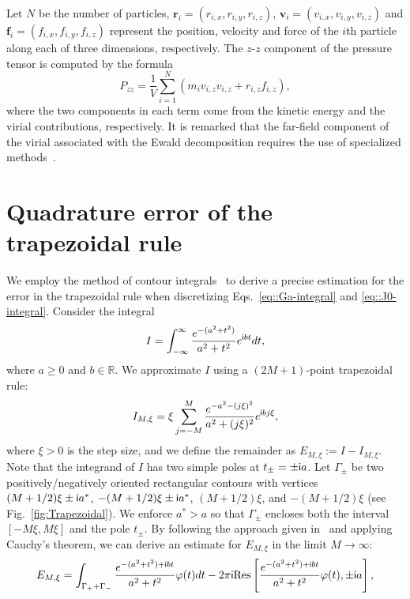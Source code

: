 Let $N$ be the number of particles, $\bm{r}_i=(r_{i,x},r_{i,y},r_{i,z})$, $\bm{v}_i=(v_{i,x},v_{i,y},v_{i,z})$ and $\bm{f}_i=(f_{i,x},f_{i,y},f_{i,z})$ represent the position, velocity and force of the $i$th particle along each of three dimensions, respectively. The $z$-$z$ component of the pressure tensor is computed by the formula
\begin{equation}
P_{zz}=\frac{1}{V} \sum_{i=1}^N\left(m_i v_{i,z} v_{i, z}+r_{i,z} f_{i,z}\right),
\end{equation}
where the two components in each term come from the kinetic energy and the virial contributions, respectively. It is remarked that the far-field component of the virial associated with the Ewald decomposition requires the use of specialized methods~\cite{liang2022random}. 

\section{Quadrature error of the trapezoidal rule}\label{app::trapezoidal}
We employ the method of contour integrals~\cite{Donaldson1972SINUA,trefethen2014Rev} to derive a precise estimation for the error in the trapezoidal rule when discretizing Eqs.~\eqref{eq::Ga-integral} and \eqref{eq::J0-integral}. Consider the integral
\begin{equation}\label{eq::A.1}
I=\int_{-\infty}^{\infty }\frac{e^{-(a^2+t^2)}}{a^2+t^2}e^{\mathsf i b t}dt,
\end{equation}
where $a\geq 0$ and $b\in\mathbb{R}$. We approximate $I$ using a $(2M+1)$-point trapezoidal rule:
\begin{equation}
I_{M,\xi}=\xi\sum_{j=-M}^{M}\frac{e^{-a^2-(j\xi)^2}}{a^2+(j\xi)^2}e^{\mathsf i b j\xi},
\end{equation}
where $\xi>0$ is the step size, and we define the remainder as $E_{M,\xi}:=I-I_{M,\xi}$. Note that the integrand of $I$ has two simple poles at $t_{\pm}=\pm \mathsf i a$. Let $\Gamma_{\pm}$ be two positively/negatively oriented rectangular contours with vertices $(M+1/2)\xi\pm\mathsf i a^*$, $-(M+1/2)\xi\pm\mathsf i a^*$, $(M+1/2)\xi$, and $-(M+1/2)\xi$ (see Fig.~\ref{fig:Trapezoidal}). We enforce $a^*>a$ so that $\Gamma_{\pm}$ encloses both the interval $[-M \xi,M \xi]$ and the pole $t_{\pm}$. By following the approach given in~\cite{Donaldson1972SINUA} and applying Cauchy's theorem, we can derive an estimate for $E_{M,\xi}$ in the limit $M\rightarrow \infty$:
\begin{equation}
E_{M,\xi}=\int_{\Gamma_++\Gamma_-}\frac{e^{-(a^2+t^2)+\mathsf i b t}}{a^2+t^2}\varphi(t)dt-2\pi\mathsf i \text{Res}\left[\frac{e^{-(a^2+t^2)+\mathsf i b t}}{a^2+t^2}\varphi(t),\pm \mathsf i a\right],
\end{equation}
